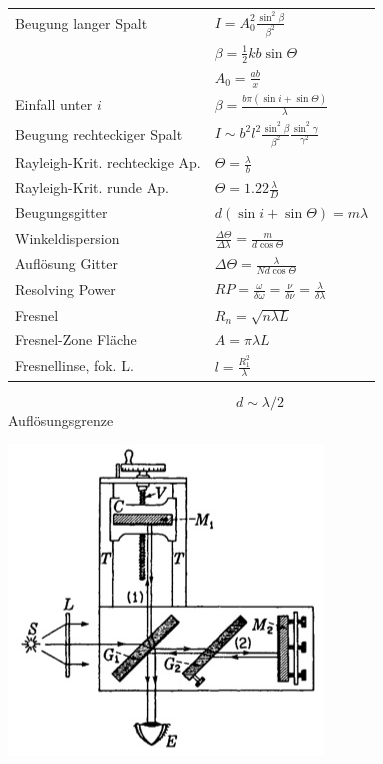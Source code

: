 \documentclass[12pt,a4paper]{article}
\renewcommand{\=}[1]{\stackrel{#1}{=}}
\theoremstyle{definition}
\theoremstyle{remark}
\begin{document}
\begin{center}
\begin{minipage}[t]{.6\linewidth}
\vspace{0pt}
\noindent\begin{tabular}{ll}
Beugung langer Spalt & $I = A_0^2 \frac{\sin^2 \beta}{\beta^2}$\\
& $\beta = \frac{1}{2}kb\sin \Theta$\\
& $A_0 = \frac{ab}{x}$\\
Einfall unter $i$ & $\beta = \frac{b \pi (\sin i + \sin \Theta)}{\lambda}$\\
Beugung rechteckiger Spalt & $I \sim b^2 l^2 \frac{\sin^2 \beta}{\beta^2} \frac{\sin^2 \gamma}{\gamma^2}$\\
Rayleigh-Krit. rechteckige Ap. & $\Theta = \frac{\lambda}{b}$\\
Rayleigh-Krit. runde Ap. & $\Theta = 1.22 \frac{\lambda}{D}$\\
Beugungsgitter & $d(\sin i + \sin \Theta) = m \lambda$\\
Winkeldispersion & $\frac{\Delta \Theta}{\Delta \lambda} = \frac{m}{d \cos \Theta}$\\
Auflösung Gitter & $\Delta \Theta = \frac{\lambda}{N d \cos \Theta}$\\
Resolving Power & $RP = \frac{\omega}{\delta \omega} = \frac{\nu}{\delta \nu} = \frac{\lambda}{\delta \lambda}$\\
Fresnel & $R_n = \sqrt{n \lambda L}$\\
Fresnel-Zone Fläche &  $A = \pi \lambda L$\\
Fresnellinse, fok. L. &  $l = \frac{R_1^2}{\lambda}$\\
\end{tabular}
\begin{framed}
$$d \sim \lambda/2$$
\centering Auflösungsgrenze
\end{framed}
\end{minipage}%
\begin{minipage}[t]{.4\linewidth}
\vspace{0pt}
\includegraphics[width=\linewidth]{pic/michelson.png}

\end{minipage}
\end{center}
\end{document}
